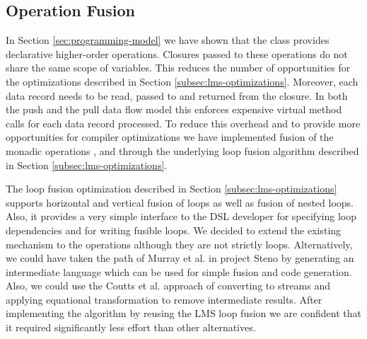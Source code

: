 \subsection{Operation Fusion}
\label{sec:fusion}

In Section \ref{sec:programming-model} we have shown that the  class
provides declarative higher-order operations. Closures passed to these
operations do not share the same scope of variables. This reduces the number of
opportunities for the optimizations described in Section
\ref{subsec:lms-optimizations}. Moreover, each data record needs to be read,
passed to and returned from the closure. In both the push and the pull data flow
model this enforces expensive virtual method calls \cite{murray_steno:_2011} for
each data record processed. To reduce this overhead and to provide more
opportunities for compiler optimizations we have implemented fusion of
the monadic operations ,  and  through the
underlying loop fusion algorithm described in Section \ref{subsec:lms-optimizations}.

The loop fusion optimization described in Section \ref{subsec:lms-optimizations}
supports horizontal and vertical fusion of loops as well as fusion of nested
loops. Also, it provides a very simple interface to the DSL developer for
specifying loop dependencies and for writing fusible loops. We decided to extend
the existing mechanism to the  operations although they are not
strictly loops. Alternatively, we could have taken the path of Murray et al. in
project Steno \cite{murray_steno:_2011} by generating an intermediate language which can be
used for simple fusion and code generation. Also, we could use the Coutts et al.
\cite{coutts_stream_2007} approach of converting  to streams and
applying equational transformation to remove intermediate results. After
implementing the algorithm by reusing the LMS loop fusion we are confident that
it required significantly less effort than other alternatives.

